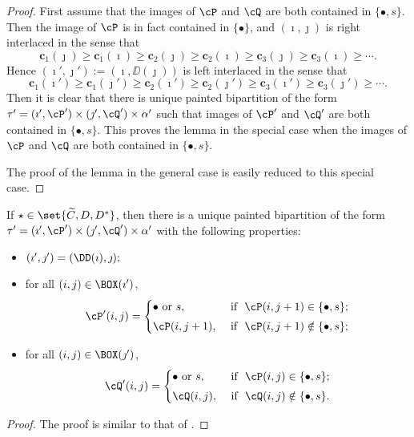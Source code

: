 \documentclass[ssunip]{subfiles}
\begin{document}
    


   \begin{proof}
    First assume that the images of $\cP$ and $\cQ$ are both contained in $\{\bullet, s\}$. Then  the image of $\cP$  is in fact contained in $\{\bullet\}$, and $(\imath, \jmath)$ is  right interlaced in the sense that 
 \[
 \mathbf{c}_1(\jmath)\geq \mathbf{c}_1(\imath)\geq \mathbf{c}_2(\jmath)\geq \mathbf{c}_2(\imath)\geq \mathbf{c}_3(\jmath)\geq \mathbf{c}_3(\imath) \geq \cdots.
 \]
 Hence $ (\imath',\jmath'):= (\imath,\DD(\jmath))$ is left interlaced in the sense that 
 \[
 \mathbf{c}_1(\imath')\geq \mathbf{c}_1(\jmath')\geq \mathbf{c}_2(\imath')\geq \mathbf{c}_2(\jmath')\geq \mathbf{c}_3(\imath')\geq \mathbf{c}_3(\jmath') \geq \cdots.
 \]
 Then it is clear that there is  unique painted bipartition of the form  $\tau'=(\imath',\cP')\times (\jmath',\cQ')\times \alpha'$ such that images of $\cP'$ and $\cQ'$ are both contained in $\{\bullet, s\}$. This proves the lemma in the special case when the images of $\cP$ and $\cQ$ are both contained in $\{\bullet, s\}$. 
 
 The proof of the lemma in the general case is easily reduced to this special case. 
   \end{proof}
    \begin{lem}\label{lemDDn2}
    If $\star \in \set{ \widetilde C, D,D^*}$, then there is a unique painted bipartition of the form $\tau'= (\imath',\cP')\times (\jmath',\cQ')\times \alpha'$ with the following properties:
  \begin{itemize}
        \item $
   (\imath',\jmath')= (\DD(\imath),\jmath); \smallskip
   $
   \item for all $(i,j)\in \BOX(\imath')$,
   \[
     \cP'(i,j)=\begin{cases}   
    \bullet \textrm{ or } s,&\textrm{ if  $\ \cP(i,j+1)\in \{\bullet, s\}$;} \smallskip \\
  \cP(i,j+1),& \textrm{ if $\ \cP(i,j+1)\notin \{\bullet, s\}$};\end{cases}
   \]
   \item for all $(i,j)\in \BOX(\jmath')$,
   \[
     \cQ'(i,j)=\begin{cases}   
    \bullet \textrm{ or } s,&\textrm{ if  $\ \cP(i,j)\in \{\bullet, s\}$;} \smallskip \\
  \cQ(i,j), & \textrm{ if $\ \cQ(i,j)\notin \{\bullet, s\}$}.  \end{cases}
   \]
  
    \end{itemize}
\end{lem}
\begin{proof}
  The proof is similar to that of . 
  
\end{proof}
\end{document}
